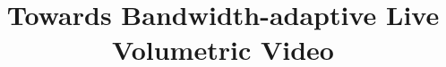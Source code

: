 \documentclass[letterpaper,twocolumn,10pt]{article}
\begin{document}
\title{Towards Bandwidth-adaptive Live Volumetric Video}
\author{}
\date{}


%
\maketitle







% 
\newpage



%
\end{document}
